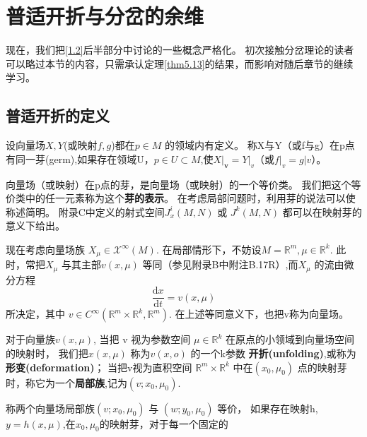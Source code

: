 \section{普适开折与分岔的余维}
现在，我们把\ref{1.2}后半部分中讨论的一些概念严格化。
初次接触分岔理论的读者可以略过本节的内容，只需承认定理\ref{thm5.13}的结果，而影响对随后章节的继续学习。
\subsection{普适开折的定义}
\begin{defination}
  设向量场\(X,Y\)(或映射\(f,g\))都在\(p \in M\) 的领域内有定义。
  称X与Y（或f与g）在p点有同一芽(germ),如果存在领域U，\(p \in U \subset M\),使$\left. X \right| _ { \mathbf { v } } = \left. Y \right| _ { v }$（或$\left. f \right| _ { v } = g | v$）。
\end{defination}

\begin{note}
  向量场（或映射）在p点的芽，是向量场（或映射）的一个等价类。
  我们把这个等价类中的任一元素称为这个\textbf{芽的表示}。
  在考虑局部问题时，利用芽的说法可以使称述简明。
  附录C中定义的射式空间\(J_x^i(M,N)\) 或 \(J^k(M,N)\) 都可以在映射芽的意义下给出。
\end{note}

现在考虑向量场族
$X _ { \mu } \in \mathscr { X } ^ { \infty } ( M )$.
在局部情形下，不妨设\(M=\mathbb{R}^m,\mu \in \mathbb{R}^k \).
此时，常把\(X_\mu\) 与其主部\(v(x,\mu)\) 等同（参见附录B中附注B.17R）,而\(X_\mu\) 的流由微分方程
\[
\frac { \mathrm { d } x } { \mathrm { d } t } = v ( x , \mu )
\]
所决定，其中
$v \in C ^ { \infty } \left(\mathbb{ R} ^ { m } \times\mathbb{ R} ^ { k } ,\mathbb{ R} ^ { m } \right)$.
在上述等同意义下，也把v称为向量场。

\begin{defination}[开折，局部族]
  对于向量族\(v(x,\mu )\), 当把 v 视为参数空间
  \( \mu \in \mathbb{R}^k \) 在原点的小领域到向量场空间的映射时，
  我们把\(x(x,\mu)\) 称为\(v(x,o)\) 的一个k参数 \textbf{开折(unfolding)},或称为\textbf{形变(deformation)}；
  当把v视为直积空间 \(\mathbb{R}^m\times \mathbb{R}^k\) 中在\((x_0,\mu_0)\) 点的映射芽时，称它为一个\textbf{局部族},记为\((v;x_0,\mu_0)\).
\end{defination}

\begin{defination}[局部族的等价]
  称两个向量场局部族\((v;x_0,\mu_0)\) 与 \((w;y_0,\mu_0)\) 等价，
  如果存在映射h,\(y=h(x,\mu)\),在\(x_0,\mu_0\)的映射芽，对于每一个固定的
\end{defination}

